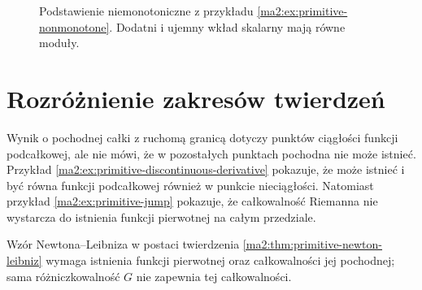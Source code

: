 \begin{figure}[htbp]
\centering
{}
\caption{Podstawienie niemonotoniczne z przykładu
\ref{ma2:ex:primitive-nonmonotone}. Dodatni i ujemny
wkład skalarny mają równe moduły.}
\label{ma2:fig:primitive-substitution}
\end{figure}

\section{Rozróżnienie zakresów twierdzeń}

Wynik o pochodnej całki z ruchomą granicą
dotyczy punktów ciągłości funkcji podcałkowej,
ale nie mówi, że w pozostałych punktach
pochodna nie może istnieć. Przykład
\ref{ma2:ex:primitive-discontinuous-derivative}
pokazuje, że może istnieć i być równa
funkcji podcałkowej również w punkcie
nieciągłości. Natomiast przykład
\ref{ma2:ex:primitive-jump} pokazuje, że
całkowalność Riemanna nie wystarcza do
istnienia funkcji pierwotnej na całym
przedziale.

Wzór Newtona--Leibniza w postaci twierdzenia
\ref{ma2:thm:primitive-newton-leibniz}
wymaga istnienia funkcji pierwotnej oraz
całkowalności jej pochodnej; sama różniczkowalność
$G$ nie zapewnia tej całkowalności.

